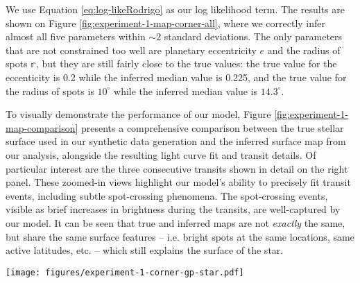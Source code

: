 \documentclass[twocolumn]{aastex631}
\begin{document}
We use Equation \ref{eq:log-likeRodrigo} as our log likelihood term. The results are shown on Figure \ref{fig:experiment-1-map-corner-all},
where we correctly infer almost all five parameters within $\sim 2$ standard deviations. The only parameters that are not constrained too well are 
planetary eccentricity $e$ and the radius of spots $\mathbb{r}$, but they are still fairly close to the true values: the true value for the
eccenticity is 0.2 while the inferred median value is 0.225, and the true value for the radius of spots is $10^\circ$ while the inferred median value is
$14.3^\circ$. 

To visually demonstrate the performance of our model, Figure \ref{fig:experiment-1-map-comparison} presents a comprehensive comparison between 
the true stellar surface used in our synthetic data generation and the inferred surface map from our analysis, alongside the resulting light curve fit and 
transit details. Of particular interest are the three consecutive transits shown in detail on the right panel. These zoomed-in views highlight our 
model's ability to precisely fit transit events, including subtle spot-crossing phenomena. The spot-crossing events, visible as brief increases in brightness 
during the transits, are well-captured by our model. It can be seen that true and inferred maps are not \emph{exactly} the same, but share the same surface features -- i.e. bright spots at the
same locations, same active latitudes, etc. -- which still explains the surface of the star.
%
\begin{figure*}[hbt!]
    \begin{centering}
        \texttt{[image: figures/experiment-1-corner-gp-star.pdf]}
        \caption{
            Posterior distributions for the all the parameters $\pmb{\Theta}$ for the synthetic data run 
            (Table \ref{tab:LongPriors} and Figure \ref{fig:experiment-1-map}). The axes span the entire prior volume, and 
            the black lines indicate the true (input) values, the dashed black lines indicate 2 standard deviations.
            In our analysis process, 
    when we encounter a solution that gives the obliquity $\lambda_{\star, \rm inferred}$ instead of $-\lambda_{\star, \rm inferred}$, we systematically transform the results. 
    Specifically, we change the inclination to $180^\circ-i_{\star, \rm inferred}$ and obliquity to $-\lambda_{\star, \rm inferred}$ for visualization purposes. 
        }
        \label{fig:experiment-1-map-corner-all}
    \end{centering}
\end{figure*}
\end{document}

